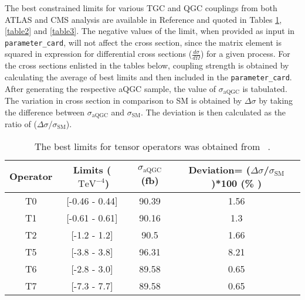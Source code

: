 The best constrained limits for various TGC and QGC couplings from both ATLAS and CMS analysis are available in Reference \cite{Limitsonanomaloustripleandquarticgaugecouplings} and quoted in Tables \ref{table1}, \ref{table2} and \ref{table3}. The negative values of the limit, when provided as input in \texttt{parameter\_card}, will not affect the cross section, since the matrix element is squared in expression for differential cross sections ($\frac{d\sigma}{d\Omega}$) for a given process. For the cross sections enlisted in the tables below, coupling strength is obtained by calculating the average of best limits and then included in the \texttt{parameter\_card}. After generating the respective aQGC sample, the value of $\sigma_\text{aQGC}$ is tabulated. The variation in cross section in comparison to SM is obtained by $\Delta\sigma$ by taking the difference between $\sigma_\text{aQGC}$ and $\sigma_\text{SM}$. The deviation is then calculated as the ratio of ($\Delta\sigma$/$\sigma_\text{SM}$).


\begin{table}
	\centering

	\begin{tabular}{|c|c|c|c|}
		\hline
		Operator & Limits ($\text{ TeV}^{-4}$)& $\sigma_\text{aQGC}$(fb)  & Deviation= ($\Delta\sigma$/$\sigma_\text{SM}$)*100 (\% )\\
		\hline \hline
		T0 & [-0.46 - 0.44]& 90.39 &  1.56 \\
		\hline
		T1 & [-0.61 - 0.61]&90.16 & 1.3   \\
		\hline
		T2 & [-1.2 - 1.2]& 90.5  & 1.66   \\
		\hline
		T5 & [-3.8 - 3.8]& 96.31 & 8.21    \\
		\hline
		T6 & [-2.8 - 3.0]& 89.58 &  0.65 \\
		\hline
		T7 & [-7.3 - 7.7]& 89.58 & 0.65    \\
		\hline
	\end{tabular}

	\caption{The best limits for tensor operators was obtained from ~\cite{TensorOpRef}.}
	\label{table1}
\end{table}

